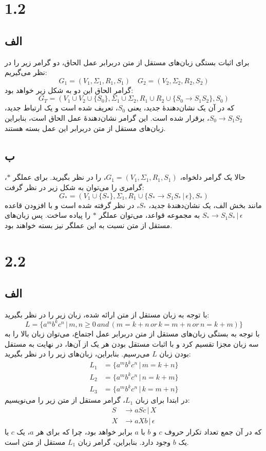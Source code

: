 \section*{1.2}

\subsection*{الف}
برای اثبات بستگی زبان‌های مستقل از متن دربرابر عمل الحاق، دو گرامر زیر را در نظر می‌گیریم:
\[
G_1 = (V_1, \Sigma_1, R_1, S_1) \quad G_2 = (V_2, \Sigma_2, R_2, S_2)
\]
گرامر الحاق این دو به شکل زیر خواهد بود:
\[
G_T = (V_1 \cup V_2 \cup \{S_0\}, \Sigma_1 \cup \Sigma_2, R_1 \cup R_2 \cup \{S_0 \to S_1 S_2\}, S_0)
\]
که در آن یک نشان‌دهندهٔ جدید، یعنی $S_0$، تعریف شده است و یک ارتباط جدید، $S_0 \to S_1 S_2$، برقرار شده است. این گرامر نشان‌دهندهٔ عمل الحاق است، بنابراین زبان‌های مستقل از متن دربرابر این عمل بسته هستند.

\subsection*{ب}
حالا یک گرامر دلخواه، $G_1 = (V_1, \Sigma_1, R_1, S_1)$، را در نظر بگیرید. برای عملگر $*$، گرامری را می‌توان به شکل زیر در نظر گرفت:
\[
G_{*} = (V_1 \cup \{S_{*}\}, \Sigma_1, R_1 \cup \{S_{*} \to S_1 S_{*} \,|\,\epsilon\}, S_{*})
\]
مانند بخش الف، یک نشان‌دهندهٔ جدید، $S_{*}$، در نظر گرفته شده است و با افزودن قاعده $S_{*} \to S_1 S_{*} \,|\,\epsilon$ به مجموعه قواعد، می‌توان عملگر $*$ را پیاده ساخت. پس زبان‌های مستقل از متن نسبت به این عملگر نیز بسته خواهند بود.

\section*{2.2}

\subsection*{الف}
با توجه به زبان مستقل از متن ارائه شده، زبان زیر را در نظر بگیرید:
\[
L = \{a^m b^k c^n \,|\, m,n \geq 0 \,and\, (m = k + n \,or\, k = m + n \,or\, n = k + m)\}    
\]
با توجه به بستگی زبان‌های مستقل از متن دربرابر عمل اجتماع، می‌توان زبان بالا را به سه زبان مجزا تقسیم کرد و با اثبات مستقل بودن هر یک از آن‌ها، در نهایت به مستقل بودن زبان $L$ می‌رسیم. بنابراین، زبان‌های زیر را در نظر بگیرید:
\begin{align*}
	L_1 &= \{a^m b^k c^n \,|\, m = k + n\} \\
	L_2 &= \{a^m b^k c^n \,|\, n = k + m\} \\
	L_3 &= \{a^m b^k c^n \,|\, k = m + n\}
\end{align*}
در ابتدا برای زبان $L_1$، گرامر مستقل از متن زیر را می‌نویسیم:
\begin{align*}
	S &\to a S c \,|\, X \\
	X &\to a X b \,|\, \epsilon
\end{align*}
که در آن جمع تعداد تکرار حروف $c$ و $b$ با $a$ برابر خواهد بود، چرا که برای هر $a$، یک $c$ یا یک $b$ وجود دارد. بنابراین، گرامر زبان $L_1$ مستقل از متن است.


